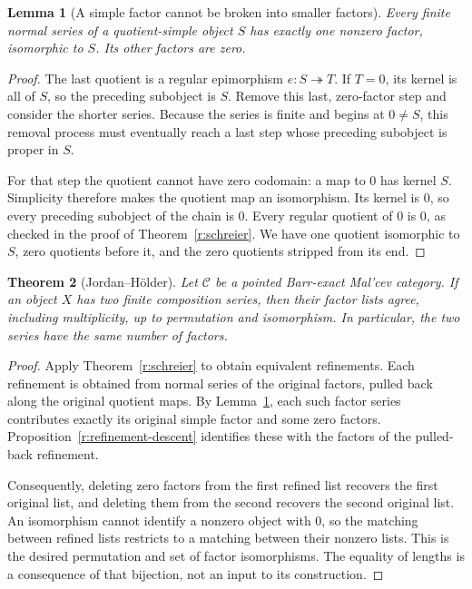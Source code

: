 \documentclass[11pt]{article}
\newtheorem{theorem}{Theorem}[section]
\newtheorem{lemma}[theorem]{Lemma}
\theoremstyle{definition}
\theoremstyle{remark}\newtheorem{remark}[theorem]{Remark}
\begin{document}
\begin{lemma}[A simple factor cannot be broken into smaller factors]
\label{j:simple-refinement}
Every finite normal series of a quotient-simple object $S$ has exactly
one nonzero factor, isomorphic to $S$.  Its other factors are zero.
\end{lemma}

\begin{proof}
The last quotient is a regular epimorphism $e:S\twoheadrightarrow T$.
If $T=0$, its kernel is all of $S$, so the preceding subobject is $S$.
Remove this last, zero-factor step and consider the shorter series.
Because the series is finite and begins at $0\neq S$, this removal
process must eventually reach a last step whose preceding subobject is
proper in $S$.

For that step the quotient cannot have zero codomain: a map to $0$ has
kernel $S$.  Simplicity therefore makes the quotient map an isomorphism.
Its kernel is $0$, so every preceding subobject of the chain is $0$.
Every regular quotient of $0$ is $0$, as checked in the proof of
Theorem~\ref{r:schreier}.  We have one quotient isomorphic to $S$, zero
quotients before it, and the zero quotients stripped from its end.
\end{proof}

\begin{theorem}[Jordan--H\"older]
\label{j:jordan-holder}
Let $\mathcal C$ be a pointed Barr-exact Mal'cev category.  If an object
$X$ has two finite composition series, then their factor lists agree,
including multiplicity, up to permutation and isomorphism.  In particular,
the two series have the same number of factors.
\end{theorem}

\begin{proof}
Apply Theorem~\ref{r:schreier} to obtain equivalent refinements.  Each
refinement is obtained from normal series of the original factors, pulled
back along the original quotient maps.  By Lemma~\ref{j:simple-refinement},
each such factor series contributes exactly its original simple factor
and some zero factors.  Proposition~\ref{r:refinement-descent} identifies
these with the factors of the pulled-back refinement.

Consequently, deleting zero factors from the first refined list recovers
the first original list, and deleting them from the second recovers the
second original list.  An isomorphism cannot identify a nonzero object
with $0$, so the matching between refined lists restricts to a matching
between their nonzero lists.  This is the desired permutation and set of
factor isomorphisms.  The equality of lengths is a consequence of that
bijection, not an input to its construction.
\end{proof}
\end{document}

